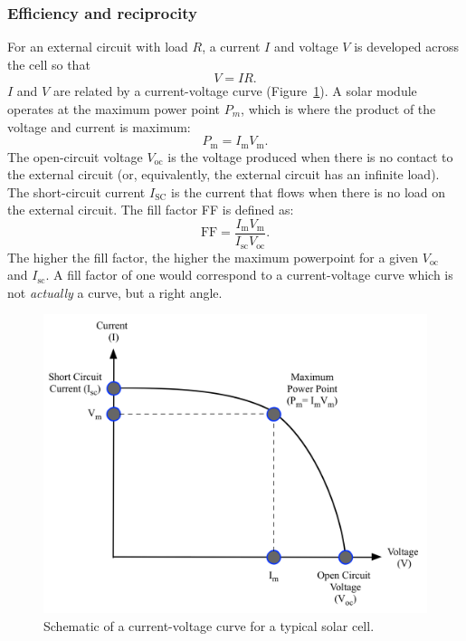 
\subsubsection{Efficiency and reciprocity}
For an external circuit with load $R$, a current $I$ and voltage $V$ is developed across the cell so that
\begin{equation}
    V = IR.
\end{equation}
$I$ and $V$ are related by a current-voltage curve (Figure\ \ref{current_voltage}).
A solar module operates at the maximum power point $P_m$, which is where the product of the voltage and current is maximum:
\begin{equation}
    P_\textrm{m}  = I_\textrm{m} V_\textrm{m}.
\end{equation} 
The open-circuit voltage $V_{\textrm{oc}}$ is the voltage produced when there is no contact to the external circuit (or, equivalently, the external circuit has an infinite load). 
The short-circuit current $I_{\textrm{SC}}$ is the current that flows when there is no load on the external circuit.
The fill factor FF is defined as:
\begin{equation}
    \textrm{FF} = \frac{I_\textrm{m}V_\textrm{m}}{I_\textrm{sc} V_\textrm{oc}}.
\end{equation}
The higher the fill factor, the higher the maximum powerpoint for a given $V_\textrm{oc}$ and $I_\textrm{sc}$.\autocite{Nelson2003} A fill factor of one would correspond to a current-voltage curve which is not \textit{actually} a curve, but a right angle.

 \begin{figure}[h]
 \centering
   \includegraphics[width=0.65\columnwidth]{figures/ch1/current-voltage.png}
   \caption[Solar cell current-voltage curve]{Schematic of a current-voltage curve for a typical solar cell.}
   \label{current_voltage}
 \end{figure}

